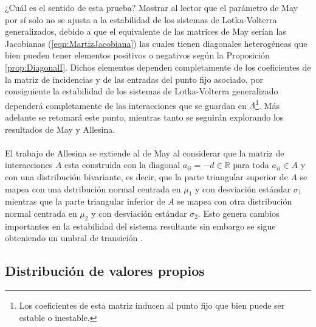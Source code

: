 ¿Cuál es el sentido de esta prueba? Mostrar al lector que el parámetro de May por sí solo no se ajusta a la estabilidad de los sistemas de Lotka-Volterra generalizados, debido a que el equivalente de las matrices de May serían las Jacobianas (\ref{eqn:MartizJacobiana}) las cuales tienen diagonales heterogéneas que bien pueden tener elementos positivos o negativos según la Proposición \ref{prop:DiagonalI}. Dichos elementos dependen completamente de los coeficientes de la matriz de incidencias y de las entradas del punto fijo asociado, por consiguiente la estabilidad de los sistemas de Lotka-Volterra generalizado dependerá completamente de las interacciones que se guardan en $\Lambda$\footnote{Los coeficientes de esta matriz inducen al punto fijo que bien puede ser estable o inestable.}. Más adelante se retomará este punto, mientras tanto se seguirán explorando los resultados de May y Allesina.\\
\\
El trabajo de Allesina se extiende al de May al considerar que la matriz de interacciones $A$ esta construida con la diagonal $a_{ii}=-d\in\mathbb{R}$ para toda $a_{ii}\in A$ y con una distribución bivariante, es decir, que la parte triangular superior de $A$ se mapea con una dstribución normal centrada en $\mu_1$ y con desviación estándar $\sigma_1$ mientras que la parte triangular inferior de $A$ se mapea con otra distribución normal centrada en $\mu_2$ y con desviación estándar $\sigma_2$. Esto genera cambios importantes en la estabilidad del sistema resultante sin embargo se sigue obteniendo un umbral de transición \cite{allesina2012stability, may1972will}.

\subsection{Distribución de valores propios}

